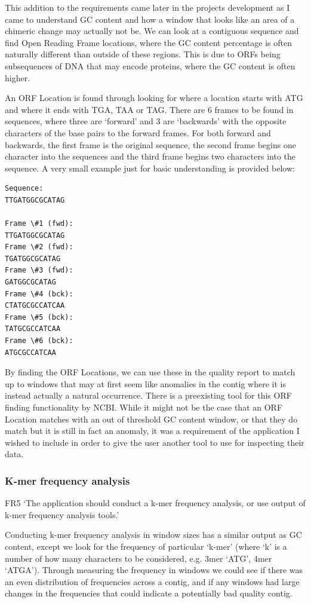 This addition to the requirements came later in the projects development as I came to understand GC content and how a window that looks like an area of a chimeric change may actually not be. We can look at a contiguous sequence and find Open Reading Frame\cite{orfdefinition} locations, where the GC content percentage is often naturally different than outside of these regions.\cite{JEU:JEU239} This is due to ORFs being subsequences of DNA that may encode proteins, where the GC content is often higher.

An ORF Location is found through looking for where a location starts with ATG and where it ends with TGA, TAA or TAG. There are 6 frames to be found in sequences, where three are `forward' and 3 are `backwards' with the opposite characters of the base pairs to the forward frames. For both forward and backwards, the first frame is the original sequence, the second frame begins one character into the sequences and the third frame begins two characters into the sequence. A very small example just for basic understanding is provided below:

\begin{verbatim}
Sequence:
TTGATGGCGCATAG

Frame \#1 (fwd):
TTGATGGCGCATAG
Frame \#2 (fwd):
TGATGGCGCATAG
Frame \#3 (fwd):
GATGGCGCATAG
Frame \#4 (bck):
CTATGCGCCATCAA
Frame \#5 (bck):
TATGCGCCATCAA
Frame \#6 (bck):
ATGCGCCATCAA
\end{verbatim}

By finding the ORF Locations, we can use these in the quality report to match up to windows that may at first seem like anomalies in the contig where it is instead actually a natural occurrence. There is a preexisting tool for this ORF finding functionality by NCBI\cite{orffinder}. While it might not be the case that an ORF Location matches with an out of threshold GC content window, or that they do match but it is still in fact an anomaly, it was a requirement of the application I wished to include in order to give the user another tool to use for inspecting their data.

\subsubsection{K-mer frequency analysis}
FR5 `The application should conduct a k-mer frequency analysis, or use output of k-mer frequency analysis tools.'

Conducting k-mer frequency analysis in window sizes has a similar output as GC content, except we look for the frequency of particular `k-mer' (where `k' is a number of how many characters to be considered, e.g. 3mer `ATG', 4mer `ATGA'). Through measuring the frequency in windows we could see if there was an even distribution of frequencies across a contig, and if any windows had large changes in the frequencies that could indicate a potentially bad quality contig.\cite{citeulike:12566531}

